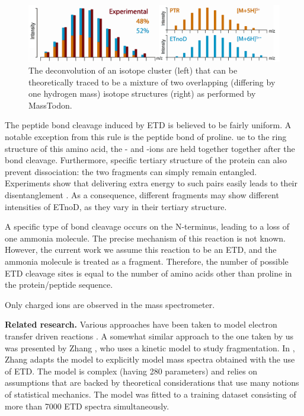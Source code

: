 \documentclass{llncs}
\begin{document}
        \begin{figure}[h]
                \center
                \includegraphics[width=.8\textwidth]{masstodon.png}
                \caption{The deconvolution of an isotope cluster (left) that can be theoretically traced to be a mixture of two overlapping (differing by one hydrogen mass) isotope structures (right) as performed by MassTodon.}\label{img::masstodon}
        \end{figure}

        The peptide bond cleavage induced by ETD is believed to be fairly uniform. A notable exception from this rule is the peptide bond of proline. ue to the ring structure of this amino acid, the - and -ions are held together together after the  bond cleavage.  Furthermore,  specific tertiary structure of the protein can also prevent dissociation: the two fragments can simply remain entangled. Experiments show that delivering extra energy to such pairs easily leads to their disentanglement \cite{Lermyte2017-zt}. As a consequence, different fragments may show different intensities of ETnoD, as they vary in their tertiary structure.

        A specific type of  bond cleavage occurs on the N-terminus, leading to a loss of one ammonia molecule. The precise mechanism of this reaction is not known. However, the current work we assume this reaction to be an ETD, and the ammonia molecule is treated as a  fragment. Therefore, the number of possible ETD cleavage sites is equal to the number of amino acids other than proline in the protein/peptide sequence.

        Only charged ions are observed in the mass spectrometer.

\textbf{Related research.}
        Various approaches have been taken to model electron transfer driven reactions \cite{Breuker2004-az,Simons2010-gy,Zhurov2013-ua,Turecek2013-fq}. A somewhat similar approach to the one taken by us was presented by Zhang \cite{Zhang2004-fp,Zhang2005-jn,Zhang2011-lg}, who uses a kinetic model to study fragmentation. In \cite{Zhang2010-fp}, Zhang adapts the model to explicitly model mass spectra obtained with the use of ETD. The model is complex (having 280 parameters) and relies on assumptions that are backed by theoretical considerations that use many notions of statistical mechanics. The model was fitted to a training dataset consisting of more than 7000 ETD spectra simultaneously.
\end{document}
